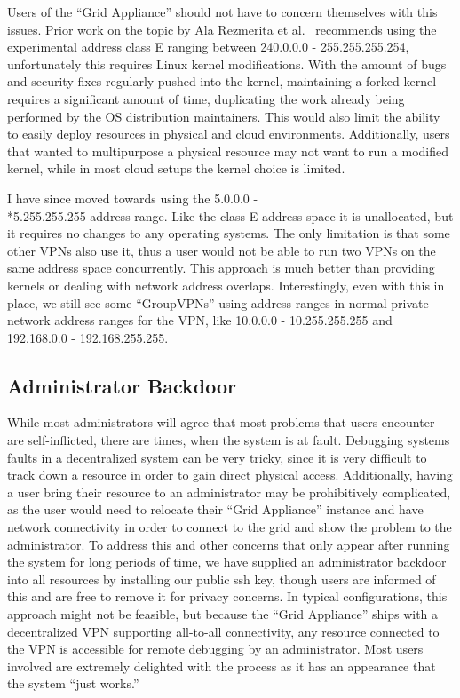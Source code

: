 Users of the ``Grid Appliance'' should not have to concern themselves with this
issues.  Prior work on the topic by Ala Rezmerita et al.~\cite{pvc} recommends
using the experimental address class E ranging between 240.0.0.0 -
255.255.255.254, unfortunately this requires Linux kernel modifications.  With
the amount of bugs and security fixes regularly pushed into the kernel,
maintaining a forked kernel requires a significant amount of time, duplicating
the work already being performed by the OS distribution maintainers.  This
would also limit the ability to easily deploy resources in physical and cloud
environments.  Additionally, users that wanted to multipurpose a physical
resource may not want to run a modified kernel, while in most cloud setups the
kernel choice is limited.

I have since moved towards using the 5.0.0.0 - \\*5.255.255.255 address range.
Like the class E address space it is unallocated, but it requires no changes to
any operating systems.  The only limitation is that some other VPNs also use
it, thus a user would not be able to run two VPNs on the same address space
concurrently.  This approach is much better than providing kernels or dealing
with network address overlaps.  Interestingly, even with this in place, we
still see some ``GroupVPNs''  using address ranges in normal private network
address ranges for the VPN, like 10.0.0.0 - 10.255.255.255 and 192.168.0.0 -
192.168.255.255.

\subsection{Administrator Backdoor}

While most administrators will agree that most problems that users encounter
are self-inflicted, there are times, when the system is at fault.  Debugging
systems faults in a decentralized system can be very tricky, since it is very
difficult to track down a resource in order to gain direct physical access.
Additionally, having a user bring their resource to an administrator may be
prohibitively complicated, as the user would need to relocate their ``Grid
Appliance'' instance and have network connectivity in order to connect to the
grid and show the problem to the administrator.  To address this and other
concerns that only appear after running the system for long periods of time, we
have supplied an administrator backdoor into all resources by installing our
public ssh key, though users are informed of this and are free to remove it for
privacy concerns.  In typical configurations, this approach might not be
feasible, but because the ``Grid Appliance'' ships with a decentralized VPN
supporting all-to-all connectivity, any resource connected to the VPN is
accessible for remote debugging by an administrator.  Most users involved are
extremely delighted with the process as it has an appearance that the system
``just works.''

